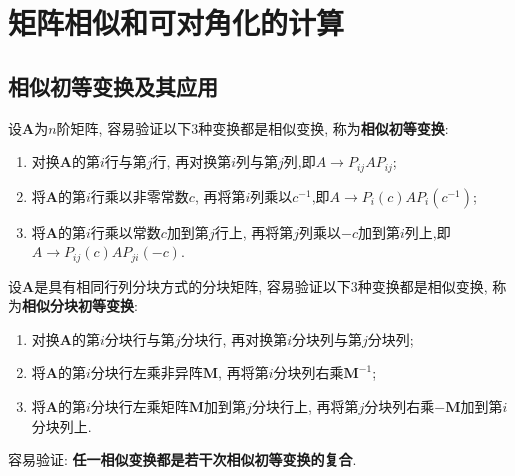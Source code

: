 \documentclass[../../main.tex]{subfiles}
\begin{document}
\section{矩阵相似和可对角化的计算}

\subsection{相似初等变换及其应用}

\begin{proposition}[相似初等变换]\label{proposition:相似初等变换}
设\(\boldsymbol{A}\)为\(n\)阶矩阵, 容易验证以下\(3\)种变换都是相似变换, 称为\textbf{相似初等变换}:
\begin{enumerate}
\item 对换\(\boldsymbol{A}\)的第\(i\)行与第\(j\)行, 再对换第\(i\)列与第\(j\)列,即$A\rightarrow P_{ij}AP_{ij}$;
\item 将\(\boldsymbol{A}\)的第\(i\)行乘以非零常数\(c\), 再将第\(i\)列乘以\(c^{-1}\),即$A\rightarrow P_i\left( c \right) AP_i\left( c^{-1} \right) $;
\item 将\(\boldsymbol{A}\)的第\(i\)行乘以常数\(c\)加到第\(j\)行上, 再将第\(j\)列乘以\(-c\)加到第\(i\)列上,即$A\rightarrow P_{ij}\left( c \right) AP_{ji}\left( -c \right)$.
\end{enumerate}

设\(\boldsymbol{A}\)是具有相同行列分块方式的分块矩阵, 容易验证以下\(3\)种变换都是相似变换, 称为\textbf{相似分块初等变换}:
\begin{enumerate}
\item 对换\(\boldsymbol{A}\)的第\(i\)分块行与第\(j\)分块行, 再对换第\(i\)分块列与第\(j\)分块列;
\item 将\(\boldsymbol{A}\)的第\(i\)分块行左乘非异阵\(\boldsymbol{M}\), 再将第\(i\)分块列右乘\(\boldsymbol{M}^{-1}\);
\item 将\(\boldsymbol{A}\)的第\(i\)分块行左乘矩阵\(\boldsymbol{M}\)加到第\(j\)分块行上, 再将第\(j\)分块列右乘\(-\boldsymbol{M}\)加到第\(i\)分块列上.
\end{enumerate}

容易验证: \textbf{任一相似变换都是若干次相似初等变换的复合}.
\end{proposition}
\end{document}
